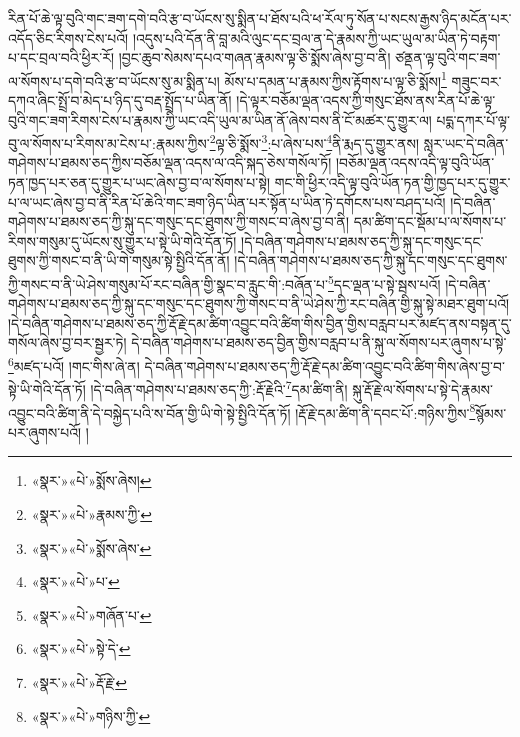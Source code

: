 རིན་པོ་ཆེ་ལྟ་བུའི་གང་ཟག་དགེ་བའི་རྩ་བ་ཡོངས་སུ་སྨིན་པ་ཐོས་པའི་ཕ་རོལ་ཏུ་སོན་པ་སངས་རྒྱས་ཉིད་མངོན་པར་འདོད་ཅིང་རིགས་ངེས་པའོ། །འདུས་པའི་དོན་ནི་བླ་མའི་ལུང་དང་བྲལ་ན་དེ་རྣམས་ཀྱི་ཡང་ཡུལ་མ་ཡིན་ཏེ་བརྟག་པ་དང་བྲལ་བའི་ཕྱིར་རོ། །བྱང་ཆུབ་སེམས་དཔའ་གཞན་རྣམས་ལྟ་ཅི་སྨོས་ཞེས་བྱ་བ་ནི། ཙནྡན་ལྟ་བུའི་གང་ཟག་ལ་སོགས་པ་དགེ་བའི་རྩ་བ་ཡོངས་སུ་མ་སྨིན་པ། མོས་པ་དམན་པ་རྣམས་ཀྱིས་རྟོགས་པ་ལྟ་ཅི་སྨོས།\footnote{«སྣར་»«པེ་»སྨོས་ཞེས།} གཟུང་བར་དཀའ་ཞིང་སྤྲོ་བ་མེད་པ་ཉིད་དུ་བརྡ་སྤྲོད་པ་ཡིན་ནོ། །དེ་ལྟར་བཅོམ་ལྡན་འདས་ཀྱི་གསུང་ཐོས་ནས་རིན་པོ་ཆེ་ལྟ་བུའི་གང་ཟག་རིགས་ངེས་པ་རྣམས་ཀྱི་ཡང་འདི་ཡུལ་མ་ཡིན་ནོ་ཞེས་བས་ནི་ངོ་མཚར་དུ་གྱུར་ལ། པདྨ་དཀར་པོ་ལྟ་བུ་ལ་སོགས་པ་རིགས་མ་ངེས་པ་:རྣམས་ཀྱིས་\footnote{«སྣར་»«པེ་»རྣམས་ཀྱི་}ལྟ་ཅི་སྨོས་\footnote{«སྣར་»«པེ་»སྨོས་ཞེས་}:པ་ཞེས་པས་\footnote{«སྣར་»«པེ་»པ་}ནི་རྨད་དུ་གྱུར་ནས། སླར་ཡང་དེ་བཞིན་གཤེགས་པ་ཐམས་ཅད་ཀྱིས་བཅོམ་ལྡན་འདས་ལ་འདི་སྐད་ཅེས་གསོལ་ཏོ། །བཅོམ་ལྡན་འདས་འདི་ལྟ་བུའི་ཡོན་ཏན་ཁྱད་པར་ཅན་དུ་གྱུར་པ་ཡང་ཞེས་བྱ་བ་ལ་སོགས་པ་སྟེ། གང་གི་ཕྱིར་འདི་ལྟ་བུའི་ཡོན་ཏན་གྱི་ཁྱད་པར་དུ་གྱུར་པ་ལ་ཡང་ཞེས་བྱ་བ་ནི་རིན་པོ་ཆེའི་གང་ཟག་ཉིད་ཡིན་པར་སྟོན་པ་ཡིན་ཏེ་དགོངས་པས་བཤད་པའོ། །དེ་བཞིན་གཤེགས་པ་ཐམས་ཅད་ཀྱི་སྐུ་དང་གསུང་དང་ཐུགས་ཀྱི་གསང་བ་ཞེས་བྱ་བ་ནི། དམ་ཚིག་དང་སྡོམ་པ་ལ་སོགས་པ་རིགས་གསུམ་དུ་ཡོངས་སུ་གྱུར་པ་སྟེ་ཡི་གེའི་དོན་ཏོ། །དེ་བཞིན་གཤེགས་པ་ཐམས་ཅད་ཀྱི་སྐུ་དང་གསུང་དང་ཐུགས་ཀྱི་གསང་བ་ནི་ཡི་གེ་གསུམ་སྟེ་སྤྱིའི་དོན་ནོ། །དེ་བཞིན་གཤེགས་པ་ཐམས་ཅད་ཀྱི་སྐུ་དང་གསུང་དང་ཐུགས་ཀྱི་གསང་བ་ནི་ཡེ་ཤེས་གསུམ་པོ་རང་བཞིན་གྱི་སྣང་བ་རླུང་གི་:བཞོན་པ་\footnote{«སྣར་»«པེ་»གཞོན་པ་}དང་ལྡན་པ་སྟེ་སྦས་པའོ། །དེ་བཞིན་གཤེགས་པ་ཐམས་ཅད་ཀྱི་སྐུ་དང་གསུང་དང་ཐུགས་ཀྱི་གསང་བ་ནི་ཡེ་ཤེས་ཀྱི་རང་བཞིན་གྱི་སྐུ་སྟེ་མཐར་ཐུག་པའོ། །དེ་བཞིན་གཤེགས་པ་ཐམས་ཅད་ཀྱི་རྡོ་རྗེ་དམ་ཚིག་འབྱུང་བའི་ཚིག་གིས་བྱིན་གྱིས་བརླབ་པར་མཛད་ནས་བསྟན་དུ་གསོལ་ཞེས་བྱ་བར་སྦྱར་ཏེ། དེ་བཞིན་གཤེགས་པ་ཐམས་ཅད་བྱིན་གྱིས་བརླབ་པ་ནི་སྐུ་ལ་སོགས་པར་ཞུགས་པ་སྟེ་\footnote{«སྣར་»«པེ་»སྟེ་དེ་}མཛད་པའོ། །གང་གིས་ཞེ་ན། དེ་བཞིན་གཤེགས་པ་ཐམས་ཅད་ཀྱི་རྡོ་རྗེ་དམ་ཚིག་འབྱུང་བའི་ཚིག་གིས་ཞེས་བྱ་བ་སྟེ་ཡི་གེའི་དོན་ཏོ། །དེ་བཞིན་གཤེགས་པ་ཐམས་ཅད་ཀྱི་:རྡོ་རྗེའི་\footnote{«སྣར་»«པེ་»རྡོ་རྗེ་}དམ་ཚིག་ནི། སྐུ་རྡོ་རྗེ་ལ་སོགས་པ་སྟེ་དེ་རྣམས་འབྱུང་བའི་ཚིག་ནི་དེ་བསྐྱེད་པའི་ས་བོན་གྱི་ཡི་གེ་སྟེ་སྤྱིའི་དོན་ཏོ། །རྡོ་རྗེ་དམ་ཚིག་ནི་དབང་པོ་:གཉིས་ཀྱིས་\footnote{«སྣར་»«པེ་»གཉིས་ཀྱི་}སྙོམས་པར་ཞུགས་པའོ། །
